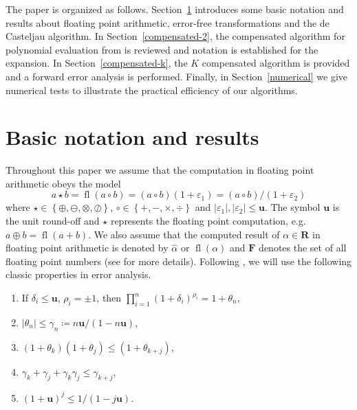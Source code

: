 \documentclass[letterpaper,10pt]{article}
\theoremstyle{definition}
\newcommand{\fl}[1]{\operatorname{fl}\left(#1\right)}
\newcommand{\eps}{\varepsilon}
\newcommand{\mach}{\mathbf{u}}
\begin{document}
The paper is organized as follows. Section~\ref{notation} introduces some
basic notation and results about floating point arithmetic, error-free
transformations and the de Casteljau algorithm. In Section~\ref{compensated-2},
the compensated algorithm for polynomial evaluation from \cite{Jiang2010} is
reviewed and notation is established for the expansion. In
Section~\ref{compensated-k}, the \(K\) compensated algorithm is provided and
a forward error analysis is performed. Finally, in Section~\ref{numerical} we
give numerical tests to illustrate the practical efficiency of our algorithms.

\section{Basic notation and results}\label{notation}

Throughout this paper we assume that the computation in floating point
arithmetic obeys the model
\begin{equation}
  a \star b = \fl{a \circ b} = (a \circ b)(1 + \eps_1) =
  (a \circ b) / (1 + \eps_2)
\end{equation}
where \(\star \in \left\{\oplus, \ominus, \otimes, \oslash\right\}\), \(\circ
\in \left\{+, -, \times, \div\right\}\) and \(\left|\eps_1\right|,
\left|\eps_2\right| \leq \mach\). The symbol \(\mach\) is the unit round-off
and \(\star\) represents the floating point computation, e.g.
\(a \oplus b = \fl{a + b}\). We also assume that the computed result of
\(\alpha \in \mathbf{R}\) in floating point arithmetic is denoted by
\(\widehat{\alpha}\) or \(\fl{\alpha}\) and \(\mathbf{F}\) denotes the set of
all floating point numbers (see \cite{Higham2002} for more details).
Following \cite{Higham2002}, we will use the following classic properties in
error analysis.

\begin{enumerate}
  \item If \(\delta_i \leq \mach\), \(\rho_i = \pm 1\), then
      \(\prod_{i = 1}^n (1 + \delta_i)^{\rho_i} = 1 + \theta_n\),
  \item \(\left|\theta_n\right| \leq \gamma_n \coloneqq
      n \mach / (1 - n \mach)\),
  \item \((1 + \theta_k)(1 + \theta_j) \leq (1 + \theta_{k + j})\),
  \item \(\gamma_k + \gamma_j + \gamma_k \gamma_j \leq \gamma_{k + j}\),
  \item \((1 + \mach)^j \leq 1 / (1 - j \mach)\).
\end{enumerate}
\end{document}
